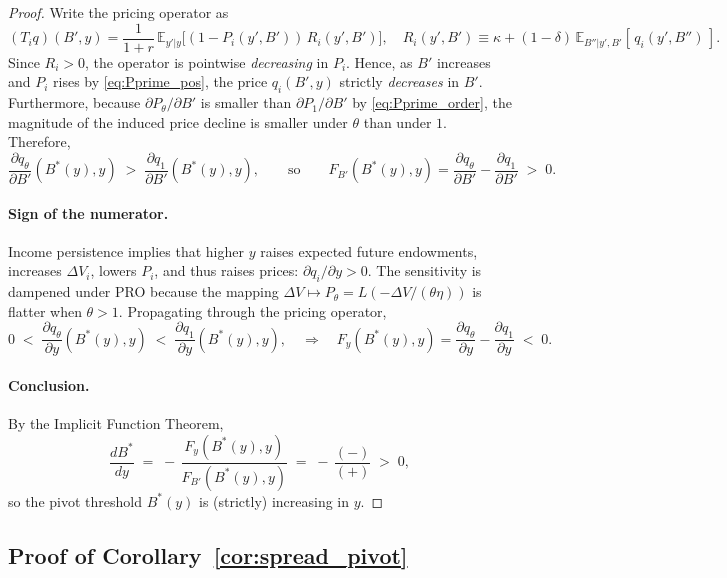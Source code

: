 \documentclass[12pt]{article}
\theoremstyle{plain}
\newcommand{\E}{\mathbb{E}}
\begin{document}
\begin{proof}
	Write the pricing operator as
	\[
		(T_i q)(B',y)=\frac{1}{1+r}\,\E_{y'|y}\!\Big[(1-P_i(y',B'))\,R_i(y',B')\Big],\quad
		R_i(y',B')\equiv \kappa+(1-\delta)\,\E_{B''|y',B'}[\,q_i(y',B'')\,].
	\]
	Since \(R_i>0\), the operator is pointwise \emph{decreasing} in \(P_i\). Hence,
	as \(B'\) increases and \(P_i\) rises by \eqref{eq:Pprime_pos}, the price
	\(q_i(B',y)\) strictly \emph{decreases} in \(B'\). Furthermore, because
	\(\partial P_\theta/\partial B'\) is smaller than \(\partial P_1/\partial B'\)
	by \eqref{eq:Pprime_order}, the magnitude of the induced price decline is
	smaller under \(\theta\) than under \(1\). Therefore,
	\begin{equation}
		\frac{\partial q_\theta}{\partial B'}(B^*(y),y)\;>\;\frac{\partial q_1}{\partial B'}(B^*(y),y),
		\qquad\text{so}\qquad
		F_{B'}(B^*(y),y)=\frac{\partial q_\theta}{\partial B'}-\frac{\partial q_1}{\partial B'}\;>\;0.
		\label{eq:denominator_sign_correct}
	\end{equation}

	\paragraph{Sign of the numerator.}
	Income persistence implies that higher \(y\) raises expected future endowments,
	increases \(\Delta V_i\), lowers \(P_i\), and thus raises prices: \(\partial
	q_i/\partial y>0\). The sensitivity is dampened under PRO because the mapping
	\(\Delta V \mapsto P_\theta=L(-\Delta V/(\theta\eta))\) is flatter when
	\(\theta>1\). Propagating through the pricing operator,
	\begin{equation}
		0 \;<\; \frac{\partial q_\theta}{\partial y}(B^*(y),y) \;<\; \frac{\partial q_1}{\partial y}(B^*(y),y),
		\quad\Rightarrow\quad
		F_y(B^*(y),y)=\frac{\partial q_\theta}{\partial y}-\frac{\partial q_1}{\partial y}\;<\;0.
		\label{eq:income_derivative_sign_correct}
	\end{equation}

	\paragraph{Conclusion.}
	By the Implicit Function Theorem,
	\[
		\frac{dB^*}{dy} \;=\; -\,\frac{F_y(B^*(y),y)}{F_{B'}(B^*(y),y)}
		\;=\; -\,\frac{(-)}{(+)} \;>\; 0,
	\]
	so the pivot threshold \(B^*(y)\) is (strictly) increasing in \(y\).
\end{proof}

\subsection{Proof of Corollary~\ref{cor:spread_pivot}}\label{app:proof_spread_pivot}
\end{document}
